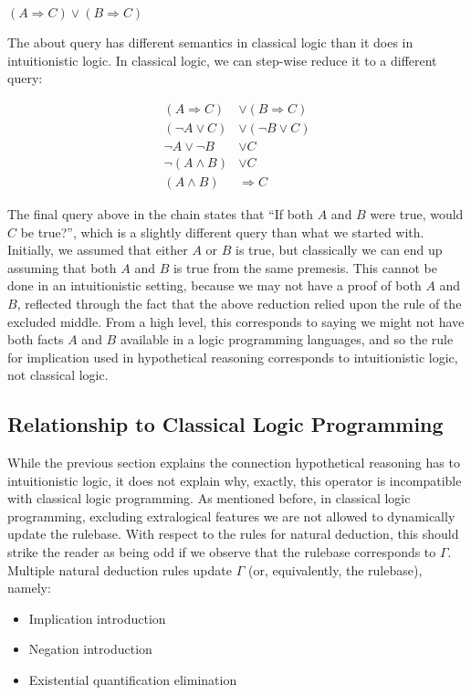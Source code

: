 \begin{center}
  $(A \Rightarrow C) \lor (B \Rightarrow C)$
\end{center}

\noindent The about query has different semantics in classical logic than it does in intuitionistic logic.
In classical logic, we can step-wise reduce it to a different query:

\begin{center}
  \begin{align*}
    (A \Rightarrow C) &\lor (B \Rightarrow C)\\
    (\neg A \lor C) &\lor (\neg B \lor C)\\
    \neg A \lor \neg B &\lor C\\
    \neg(A \land B) &\lor C\\
    (A \land B) &\Rightarrow C
  \end{align*}
\end{center}

The final query above in the chain states that ``If both $A$ and $B$ were true, would $C$ be true?'', which is a slightly different query than what we started with.
Initially, we assumed that either $A$ or $B$ is true, but classically we can end up assuming that both $A$ and $B$ is true from the same premesis.
This cannot be done in an intuitionistic setting, because we may not have a proof of both $A$ and $B$, reflected through the fact that the above reduction relied upon the rule of the excluded middle.
From a high level, this corresponds to saying we might not have both facts $A$ and $B$ available in a logic programming languages, and so the rule for implication used in hypothetical reasoning corresponds to intuitionistic logic, not classical logic.

\subsection{Relationship to Classical Logic Programming}
While the previous section explains the connection hypothetical reasoning has to intuitionistic logic, it does not explain why, exactly, this operator is incompatible with classical logic programming.
As mentioned before, in classical logic programming, excluding extralogical features we are not allowed to dynamically update the rulebase.
With respect to the rules for natural deduction, this should strike the reader as being odd if we observe that the rulebase corresponds to $\Gamma$.
Multiple natural deduction rules update $\Gamma$ (or, equivalently, the rulebase), namely:
\begin{itemize}
  \item Implication introduction
  \item Negation introduction
  \item Existential quantification elimination
\end{itemize}

